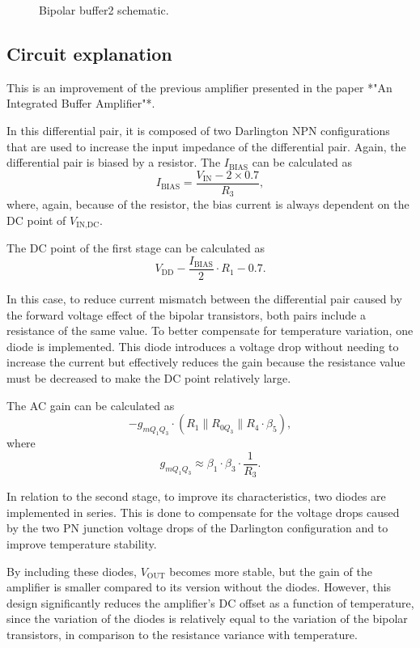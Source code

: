 \documentclass[12pt]{article}
\begin{document}
\begin{figure}[H]
        \centering
        
        \caption{Bipolar buffer2  schematic.}
        \label{bipolarbuffer02}
\end{figure}

\subsection{Circuit explanation}

This is an improvement of the previous amplifier presented in the paper *"An Integrated Buffer Amplifier"*.  

In this differential pair, it is composed of two Darlington NPN configurations that are used to increase the input impedance of the differential pair. Again, the differential pair is biased by a resistor. The $I_{\text{BIAS}}$ can be calculated as  
\[
I_{\text{BIAS}} = \frac{V_{\text{IN}} - 2 \times 0.7}{R_3},
\]  
where, again, because of the resistor, the bias current is always dependent on the DC point of $V_{\text{IN,DC}}$.  

The DC point of the first stage can be calculated as  
\[
V_{\text{DD}} - \frac{I_{\text{BIAS}}}{2} \cdot R_1 - 0.7.
\]  

In this case, to reduce current mismatch between the differential pair caused by the forward voltage effect of the bipolar transistors, both pairs include a resistance of the same value. To better compensate for temperature variation, one diode is implemented. This diode introduces a voltage drop without needing to increase the current but effectively reduces the gain because the resistance value must be decreased to make the DC point relatively large.  

The AC gain can be calculated as  
\[
-g_{mQ_1Q_3} \cdot \left( R_1 \parallel R_{0Q_3} \parallel R_4 \cdot \beta_5 \right),
\]  
where  
\[
g_{mQ_1Q_3} \approx \beta_1 \cdot \beta_3 \cdot \frac{1}{R_3}.
\]

In relation to the second stage, to improve its characteristics, two diodes are implemented in series. This is done to compensate for the voltage drops caused by the two PN junction voltage drops of the Darlington configuration and to improve temperature stability.  

By including these diodes, $V_{\text{OUT}}$ becomes more stable, but the gain of the amplifier is smaller compared to its version without the diodes. However, this design significantly reduces the amplifier's DC offset as a function of temperature, since the variation of the diodes is relatively equal to the variation of the bipolar transistors, in comparison to the resistance variance with temperature.  
\end{document}
